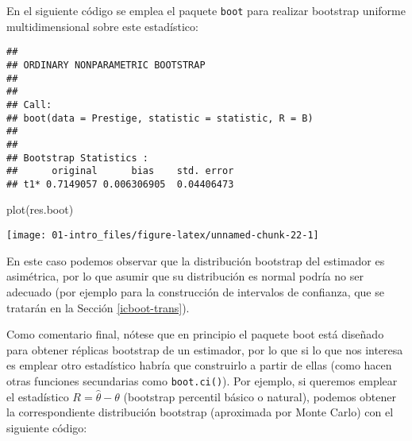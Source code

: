 \documentclass[
]{book}
\newenvironment{Shaded}{\begin{snugshade}}{\end{snugshade}}
\newcommand{\AttributeTok}[1]{\textcolor[rgb]{0.77,0.63,0.00}{#1}}
\newcommand{\ControlFlowTok}[1]{\textcolor[rgb]{0.13,0.29,0.53}{\textbf{#1}}}
\newcommand{\DecValTok}[1]{\textcolor[rgb]{0.00,0.00,0.81}{#1}}
\newcommand{\FunctionTok}[1]{\textcolor[rgb]{0.00,0.00,0.00}{#1}}
\newcommand{\NormalTok}[1]{#1}
\newcommand{\OtherTok}[1]{\textcolor[rgb]{0.56,0.35,0.01}{#1}}
\newcommand{\SpecialCharTok}[1]{\textcolor[rgb]{0.00,0.00,0.00}{#1}}
\theoremstyle{break}
\theoremstyle{definition}
\theoremstyle{definition}
\theoremstyle{definition}
\theoremstyle{definition}
\theoremstyle{remark}
\begin{document}
En el siguiente código se emplea el paquete \texttt{boot} para realizar bootstrap uniforme multidimensional sobre este estadístico:

\begin{Shaded}
\end{Shaded}

\begin{verbatim}
## 
## ORDINARY NONPARAMETRIC BOOTSTRAP
## 
## 
## Call:
## boot(data = Prestige, statistic = statistic, R = B)
## 
## 
## Bootstrap Statistics :
##      original      bias    std. error
## t1* 0.7149057 0.006306905  0.04406473
\end{verbatim}

\begin{Shaded}
\begin{Highlighting}[]
\FunctionTok{plot}\NormalTok{(res.boot)}
\end{Highlighting}
\end{Shaded}

\begin{center}\texttt{[image: 01-intro\_files/figure-latex/unnamed-chunk-22-1]} \end{center}

En este caso podemos observar que la distribución bootstrap del estimador es asimétrica, por lo que asumir que su distribución es normal podría no ser adecuado (por ejemplo para la construcción de intervalos de confianza, que se tratarán en la Sección \ref{icboot-trans}).

Como comentario final, nótese que en principio el paquete boot está diseñado para obtener réplicas bootstrap de un estimador, por lo que si lo que nos interesa es emplear otro estadístico habría que construirlo a partir de ellas (como hacen otras funciones secundarias como \texttt{boot.ci()}).
Por ejemplo, si queremos emplear el estadístico \(R = \hat \theta - \theta\)
(bootstrap percentil básico o natural), podemos obtener la correspondiente distribución bootstrap (aproximada por Monte Carlo) con el siguiente código:
\end{document}
